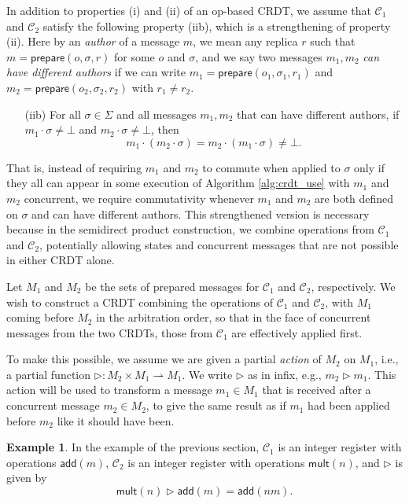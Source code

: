 \documentclass[acmsmall,nonacm]{acmart}
\newcommand{\mc}[1]{\ensuremath{\mathcal{#1}}}
\newcommand{\msf}[1]{\ensuremath{\mathsf{#1}}}
\newcommand{\pra}{\rightharpoonup}
\newcommand{\act}{\triangleright}
\theoremstyle{plain}
\theoremstyle{definition}
\newtheorem{myex}[mythm]{Example}
\begin{document}
In addition to properties (i) and (ii) of an op-based CRDT, we assume that $\mc{C}_1$ and $\mc{C}_2$ satisfy the following property (iib), which is a strengthening of property (ii).  Here by an \textit{author} of a message $m$, we mean any replica $r$ such that $m = \msf{prepare}(o, \sigma, r)$ for some $o$ and $\sigma$, and we say two messages $m_1, m_2$ \textit{can have different authors} if we can write $m_1 = \msf{prepare}(o_1, \sigma_1, r_1)$ and $m_2 = \msf{prepare}(o_2, \sigma_2, r_2)$ with $r_1 \neq r_2$.
\begin{itemize}
    \item[(iib)] For all $\sigma \in \Sigma$ and all messages $m_1, m_2$ that can have different authors, if $m_1 \cdot \sigma \neq \bot$ and $m_2 \cdot \sigma \neq \bot$, then
    \[
    m_1 \cdot (m_2 \cdot \sigma) = m_2 \cdot (m_1 \cdot \sigma) \neq \bot.
    \]
\end{itemize}
That is, instead of requiring $m_1$ and $m_2$ to commute when applied to $\sigma$ only if they all can appear in some execution of Algorithm \ref{alg:crdt_use} with $m_1$ and $m_2$ concurrent, we require commutativity whenever $m_1$ and $m_2$ are both defined on $\sigma$ and can have different authors.  This strengthened version is necessary because in the semidirect product construction, we combine operations from $\mc{C}_1$ and $\mc{C}_2$, potentially allowing states and concurrent messages that are not possible in either CRDT alone.

Let $M_1$ and $M_2$ be the sets of prepared messages for $\mc{C}_1$ and $\mc{C}_2$, respectively.  We wish to construct a CRDT combining the operations of $\mc{C}_1$ and $\mc{C}_2$, with $M_1$ coming before $M_2$ in the arbitration order, so that in the face of concurrent messages from the two CRDTs, those from $\mc{C}_1$ are effectively applied first.

To make this possible, we assume we are given a partial \textit{action} of $M_2$ on $M_1$, i.e., a partial function $\act: M_2 \times M_1 \pra M_1$.  We write $\act$ as in infix, e.g., $m_2 \act m_1$.  This action will be used to transform a message $m_1 \in M_1$ that is received after a concurrent message $m_2 \in M_2$, to give the same result as if $m_1$ had been applied before $m_2$ like it should have been.

\begin{myex}
In the example of the previous section, $\mc{C}_1$ is an integer register with operations $\msf{add}(m)$, $\mc{C}_2$ is an integer register with operations $\msf{mult}(n)$, and $\act$ is given by
\[
\msf{mult}(n) \act \msf{add}(m) = \msf{add}(nm).
\]
\end{myex}
\end{document}
